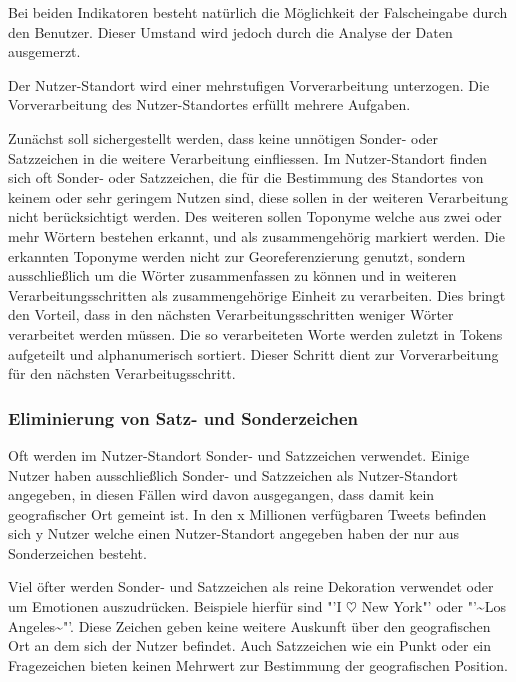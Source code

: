 		Bei beiden Indikatoren besteht natürlich die Möglichkeit der Falscheingabe durch den Benutzer. Dieser Umstand wird jedoch durch die Analyse der Daten ausgemerzt.  


		Der Nutzer-Standort wird einer mehrstufigen Vorverarbeitung unterzogen.
		Die Vorverarbeitung des Nutzer-Standortes erfüllt mehrere Aufgaben. 

		Zunächst soll sichergestellt werden, dass keine unnötigen Sonder- oder Satzzeichen in die weitere Verarbeitung einfliessen. 
		Im Nutzer-Standort finden sich oft Sonder- oder Satzzeichen, die für die Bestimmung des Standortes von keinem oder sehr geringem Nutzen sind, diese sollen in der weiteren Verarbeitung nicht berücksichtigt werden.
	  	Des weiteren sollen Toponyme welche aus zwei oder mehr Wörtern bestehen  erkannt, und als zusammengehörig markiert werden.
	  	Die erkannten Toponyme werden nicht zur Georeferenzierung genutzt, sondern ausschließlich um die Wörter zusammenfassen zu können und in weiteren Verarbeitungsschritten als zusammengehörige Einheit zu verarbeiten.
	  	Dies bringt den Vorteil, dass in den nächsten Verarbeitungsschritten weniger Wörter verarbeitet werden müssen.
	  	Die so verarbeiteten Worte werden zuletzt in Tokens aufgeteilt und alphanumerisch sortiert. 
	  	Dieser Schritt dient zur Vorverarbeitung für den nächsten Verarbeitugsschritt.

		  	\subsubsection{Eliminierung von Satz- und Sonderzeichen}
		  	Oft werden im Nutzer-Standort Sonder- und Satzzeichen verwendet. 
			Einige Nutzer haben ausschließlich Sonder- und Satzzeichen als Nutzer-Standort angegeben, in diesen Fällen wird davon ausgegangen, dass damit kein geografischer Ort gemeint ist. 
			In den x Millionen verfügbaren Tweets befinden sich y Nutzer welche einen Nutzer-Standort angegeben haben der nur aus Sonderzeichen besteht. 

			Viel öfter werden Sonder- und Satzzeichen als reine Dekoration verwendet oder um Emotionen auszudrücken. 
			Beispiele hierfür sind "'I $\heartsuit$ New York"' oder "'\dagger\textasciitilde Los Angeles\textasciitilde\dagger"'.
			Diese Zeichen geben keine weitere Auskunft über den geografischen Ort an dem sich der Nutzer befindet. 
			Auch Satzzeichen wie ein Punkt oder ein Fragezeichen bieten keinen Mehrwert zur Bestimmung der geografischen Position. 



